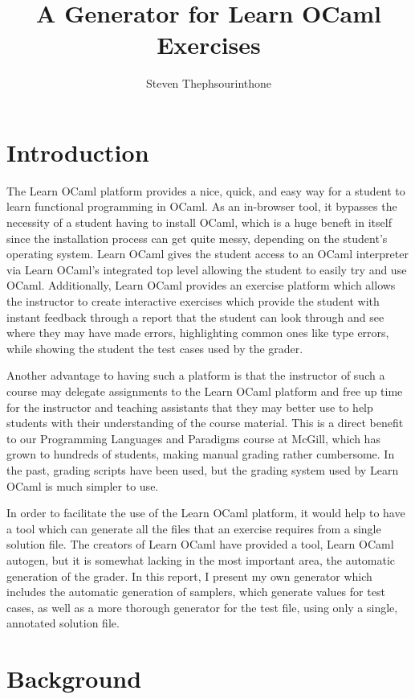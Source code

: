 \documentclass[11pt]{article}
\title{A Generator for Learn OCaml Exercises}
\author{Steven Thephsourinthone}
\begin{document}
\maketitle

\section{Introduction}
The Learn OCaml \cite{canou2017scaling} platform provides a nice, quick, and easy way for a student to learn functional programming in OCaml. As an in-browser tool, it bypasses the necessity of a student having to install OCaml, which is a huge beneft in itself since the installation process can get quite messy, depending on the student's operating system. Learn OCaml gives the student access to an OCaml interpreter via Learn OCaml's integrated top level allowing the student to easily try and use OCaml. Additionally, Learn OCaml provides an exercise platform which allows the instructor to create interactive exercises which provide the student with instant feedback through a report that the student can look through and see where they may have made errors, highlighting common ones like type errors, while showing the student the test cases used by the grader.

Another advantage to having such a platform is that the instructor of such a course may delegate assignments to the Learn OCaml platform and free up time for the instructor and teaching assistants that they may better use to help students with their understanding of the course material. This is a direct benefit to our Programming Languages and Paradigms course at McGill, which has grown to hundreds of students, making manual grading rather cumbersome. In the past, grading scripts have been used, but the grading system used by Learn OCaml is much simpler to use.

In order to facilitate the use of the Learn OCaml platform, it would help to have a tool which can generate all the files that an exercise requires from a single solution file. The creators of Learn OCaml have provided a tool, Learn OCaml autogen, but it is somewhat lacking in the most important area, the automatic generation of the grader. In this report, I present my own generator which includes the automatic generation of samplers, which generate values for test cases, as well as a more thorough generator for the test file, using only a single, annotated solution file.

\section{Background}
\end{document}
